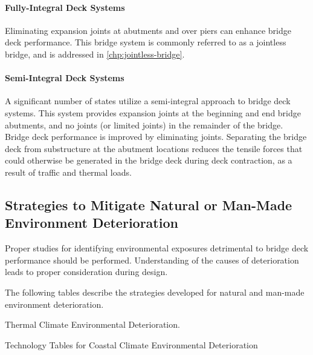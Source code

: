 \paragraph{Fully-Integral Deck Systems}
Eliminating expansion joints at abutments and over piers can enhance bridge deck performance. This bridge system is commonly referred to as a jointless bridge, and is addressed in \cref{chp:jointless-bridge}.

\paragraph{Semi-Integral Deck Systems}
A significant number of states utilize a semi-integral approach to bridge deck systems. This system provides
expansion joints at the beginning and end bridge abutments, and no joints (or limited joints) in the remainder of the
bridge. Bridge deck performance is improved by eliminating joints. Separating the bridge deck from substructure at
the abutment locations reduces the tensile forces that could otherwise be generated in the bridge deck during deck
contraction, as a result of traffic and thermal loads.


\subsection{Strategies to Mitigate Natural or Man-Made Environment Deterioration}
\label{subsec:strategies-mitigate-hazard}
Proper studies for identifying environmental exposures detrimental to bridge deck performance should be
performed. Understanding of the causes of deterioration leads to proper consideration during design.

The following tables describe the strategies developed for natural and man-made environment deterioration.

\begin{table}
  \caption{Thermal Climate Environmental Deterioration.}
  \label{tab:thermal-climate-deterioration}
\end{table}

\begin{table}
  \caption{Technology Tables for Coastal Climate Environmental Deterioration}
  \label{tab:Coastal-climate-deterioration}
\end{table}

